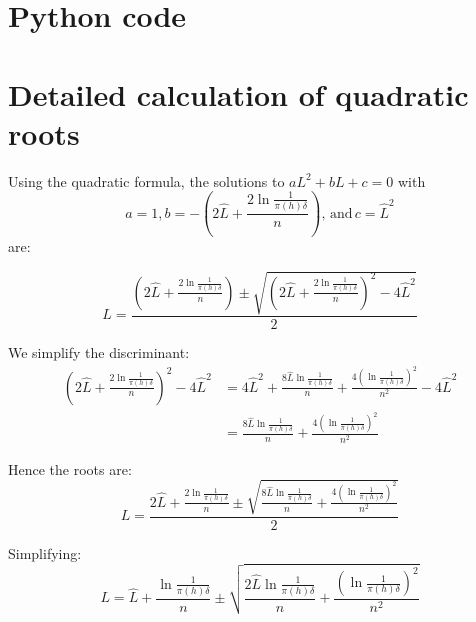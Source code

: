 \section*{Python code}





\section*{Detailed calculation of quadratic roots}\label{sec:derivation}

Using the quadratic formula, the solutions to $aL^2 + bL + c = 0$ with
\begin{equation*}
a = 1, b = -\left(2\hat{L} + \frac{2\ln\frac{1}{\pi(h)\delta}}{n}\right), \,\text{and}\, c = \hat{L}^2
\end{equation*}
are:

$$L = \frac{\left(2\hat{L} + \frac{2\ln\frac{1}{\pi(h)\delta}}{n}\right) \pm \sqrt{\left(2\hat{L} + \frac{2\ln\frac{1}{\pi(h)\delta}}{n}\right)^2 - 4\hat{L}^2}}{2}$$

We simplify the discriminant:
\begin{align*}
\left(2\hat{L} + \frac{2\ln\frac{1}{\pi(h)\delta}}{n}\right)^2 - 4\hat{L}^2 &= 4\hat{L}^2 + \frac{8\hat{L}\ln\frac{1}{\pi(h)\delta}}{n} + \frac{4(\ln\frac{1}{\pi(h)\delta})^2}{n^2} - 4\hat{L}^2 \\
&= \frac{8\hat{L}\ln\frac{1}{\pi(h)\delta}}{n} + \frac{4(\ln\frac{1}{\pi(h)\delta})^2}{n^2}
\end{align*}

Hence the roots are:
$$L = \frac{2\hat{L} + \frac{2\ln\frac{1}{\pi(h)\delta}}{n} \pm \sqrt{\frac{8\hat{L}\ln\frac{1}{\pi(h)\delta}}{n} + \frac{4(\ln\frac{1}{\pi(h)\delta})^2}{n^2}}}{2}$$

Simplifying:
$$L = \hat{L} + \frac{\ln\frac{1}{\pi(h)\delta}}{n} \pm \sqrt{\frac{2\hat{L}\ln\frac{1}{\pi(h)\delta}}{n} + \frac{(\ln\frac{1}{\pi(h)\delta})^2}{n^2}}$$

